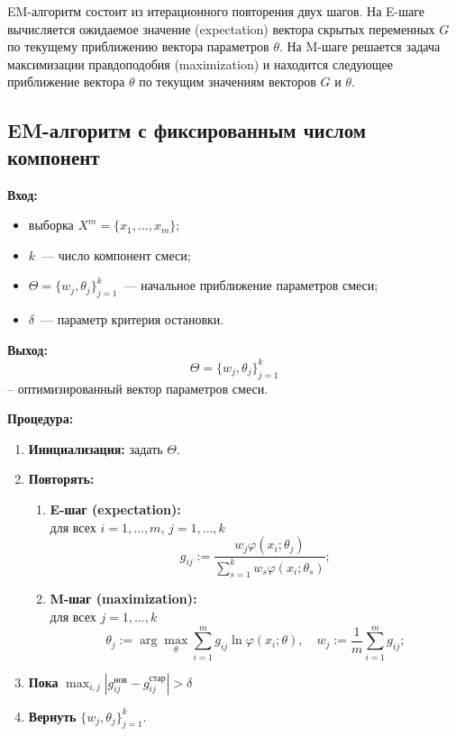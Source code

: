 EM-алгоритм состоит из итерационного повторения двух шагов. На E-шаге вычисляется ожидаемое значение (expectation) вектора скрытых переменных $G$ по текущему приближению вектора параметров $\theta$. На M-шаге решается задача максимизации правдоподобия (maximization) и находится следующее приближение вектора $\theta$ по текущим значениям векторов $G$ и $\theta$.

\subsection*{EM-алгоритм с фиксированным числом компонент}
\noindent
\textbf{Вход:}
\begin{itemize}
    \item выборка $X^m = \{x_1, \dots, x_m\}$;
    \item $k$~--- число компонент смеси;
    \item $\Theta = \{w_j, \theta_j\}_{j=1}^k$~--- начальное приближение параметров смеси;
    \item $\delta$~--- параметр критерия остановки.
\end{itemize}

\noindent
\textbf{Выход:}
\[\Theta = \{w_j, \theta_j\}_{j=1}^k\] -- оптимизированный вектор параметров смеси.

\noindent
\textbf{Процедура:}
\begin{enumerate}
    \item \textbf{Инициализация:} задать $\Theta$.
    \item \textbf{Повторять:}
          \begin{enumerate}
              \item \textbf{E-шаг (expectation):}\\
                    для всех $i = 1, \dots, m$, $j = 1, \dots, k$\\
                    \[g_{ij} := \frac{w_j \varphi(x_i; \theta_j)}{\sum_{s=1}^k w_s \varphi(x_i; \theta_s)};
                    \]
              \item \textbf{M-шаг (maximization):}\\
                    для всех $j = 1, \dots, k$\\
                    \[
                        \theta_j := \arg \max_{\theta} \sum_{i=1}^m g_{ij} \ln \varphi(x_i; \theta), \quad w_j := \frac{1}{m} \sum_{i=1}^m g_{ij};
                    \]
          \end{enumerate}
    \item \textbf{Пока} $\max_{i,j} |g^{\text{нов}}_{ij} - g^{\text{стар}}_{ij}| > \delta$
    \item \textbf{Вернуть} $\{w_j, \theta_j\}_{j=1}^k$.
\end{enumerate}

